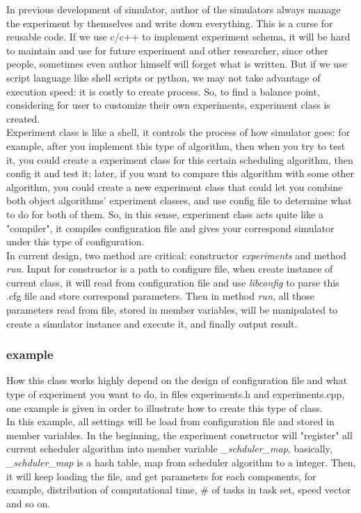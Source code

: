 \documentclass[11pt, oneside]{article}
\begin{document}
In previous development of simulator, author of the simulators always manage the experiment by themselves and write down everything. This is a curse for reusable code. If we use c/c++ to implement experiment schema, it will be hard to maintain and use for future experiment and other researcher, since other people, sometimes even author himself will forget what is written. But if we use script language like shell scripts or python, we may not take advantage of execution speed: it is costly to create process. So, to find a balance point, considering for user to customize their own experiments, experiment class is created. \\

Experiment class is like a shell, it controls the process of how simulator goes: for example, after you implement this type of algorithm, then when you try to test it, you could create a experiment class for this certain scheduling algorithm, then config it and test it; later, if you want to compare this algorithm with some other algorithm, you could create a new experiment class that could let you combine both object algorithms' experiment classes, and use config file to determine what to do for both of them. So, in this sense, experiment class acts quite like a "compiler", it compiles configuration file and gives your correspond simulator under this type of configuration. \\

In current design, two method are critical: constructor \textit{experiments} and method \textit{run}. Input for constructor is a path to configure file, when create instance of current class, it will read from configuration file and use \textit{libconfig} to parse this .cfg file and store correspond parameters. Then in method \textit{run}, all those parameters read from file, stored in member variables, will be manipulated to create a simulator instance and execute it, and finally output result. \\


\subsubsection{example}
How this class works highly depend on the design of configuration file and what type of experiment you want to do, in files experiments.h and experiments.cpp, one example is given in order to illustrate how to create this type of class. \\

In this example, all settings will be load from configuration file and stored in member variables. In the beginning, the experiment constructor will "register" all current scheduler algorithm into member variable \textit{\_schduler\_map}, basically, \textit{\_schduler\_map} is a hash table, map from scheduler algorithm to a integer. Then, it will keep loading the file, and get parameters for each components, for example, distribution of computational time, \# of tasks in task set, speed vector and so on. \\
\end{document}

